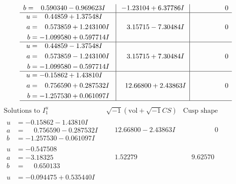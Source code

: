 \documentclass[1p]{elsarticle_modified}
\theoremstyle{definition}
\newcommand{\I}{\sqrt{-1}}
\begin{document}
$$\begin{array}{c|c|c}
\begin{aligned}
b &= \phantom{-}0.590340 - 0.969623 I\end{aligned}
 & -1.23104 + 6.37786 I & \phantom{-0.000000 } 0 \\ \hline\begin{aligned}
u &= \phantom{-}0.44859 + 1.37548 I \\
a &= \phantom{-}0.573859 + 1.243100 I \\
b &= -1.099580 + 0.597714 I\end{aligned}
 & \phantom{-}3.15715 - 7.30484 I & \phantom{-0.000000 } 0 \\ \hline\begin{aligned}
u &= \phantom{-}0.44859 - 1.37548 I \\
a &= \phantom{-}0.573859 - 1.243100 I \\
b &= -1.099580 - 0.597714 I\end{aligned}
 & \phantom{-}3.15715 + 7.30484 I & \phantom{-0.000000 } 0 \\ \hline\begin{aligned}
u &= -0.15862 + 1.43810 I \\
a &= \phantom{-}0.756590 + 0.287532 I \\
b &= -1.257530 + 0.061097 I\end{aligned}
 & \phantom{-}12.66800 + 2.43863 I & \phantom{-0.000000 } 0\\
 \hline 
 \end{array}$$\newpage$$\begin{array}{c|c|c}  
\text{Solutions to }I^u_{1}& \I (\text{vol} + \sqrt{-1}CS) & \text{Cusp shape}\\
 \hline 
\begin{aligned}
u &= -0.15862 - 1.43810 I \\
a &= \phantom{-}0.756590 - 0.287532 I \\
b &= -1.257530 - 0.061097 I\end{aligned}
 & \phantom{-}12.66800 - 2.43863 I & \phantom{-0.000000 } 0 \\ \hline\begin{aligned}
u &= -0.547508\phantom{ +0.000000I} \\
a &= -3.18325\phantom{ +0.000000I} \\
b &= \phantom{-}0.650133\phantom{ +0.000000I}\end{aligned}
 & \phantom{-}1.52279\phantom{ +0.000000I} & \phantom{-}9.62570\phantom{ +0.000000I} \\ \hline\begin{aligned}
u &= -0.094475 + 0.535440 I \\

\end{aligned}
\end{array}$$
\end{document}
